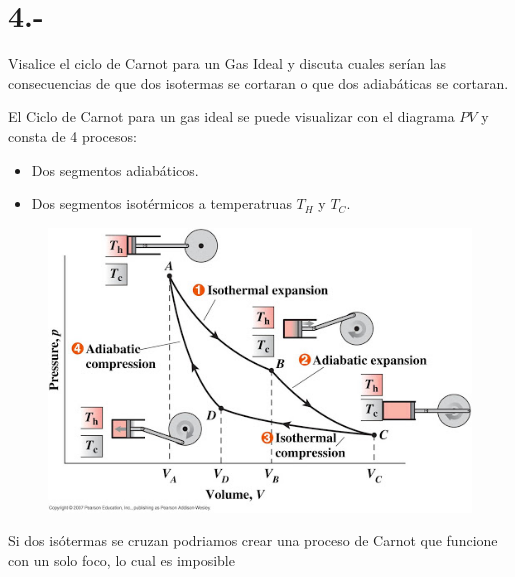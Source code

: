 \documentclass{article}
\begin{document}
\section*{4.-}
Visalice el ciclo de Carnot para un Gas Ideal y discuta cuales serían las consecuencias de que dos isotermas 
se cortaran o que dos adiabáticas se cortaran.
\begin{tcolorbox}[breakable]
    El Ciclo de Carnot para un gas ideal se puede visualizar con el diagrama $PV$ y consta de 4 procesos:
    \begin{itemize}
        \item Dos segmentos adiabáticos.
        \item Dos segmentos isotérmicos a temperatruas $T_H$ y $T_C$.
    \end{itemize}
    \begin{figure}[H]
        \centering
        \includegraphics[scale=0.5]{images/p4_diagram.jpg}
    \end{figure}
    Si dos isótermas se cruzan podriamos crear una proceso de Carnot que funcione con un solo foco, lo cual es
    imposible
\end{tcolorbox}
\end{document}
